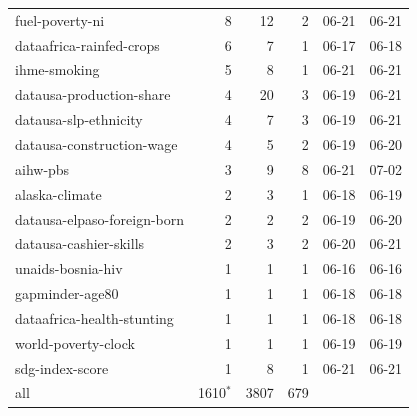 \begin{tabular}{lrrrll}
fuel-poverty-ni & 8 & 12 & 2 & 06-21 & 06-21 \\
dataafrica-rainfed-crops & 6 & 7 & 1 & 06-17 & 06-18 \\
ihme-smoking & 5 & 8 & 1 & 06-21 & 06-21 \\
datausa-production-share & 4 & 20 & 3 & 06-19 & 06-21 \\
datausa-slp-ethnicity & 4 & 7 & 3 & 06-19 & 06-21 \\
datausa-construction-wage & 4 & 5 & 2 & 06-19 & 06-20 \\
aihw-pbs & 3 & 9 & 8 & 06-21 & 07-02 \\
alaska-climate & 2 & 3 & 1 & 06-18 & 06-19 \\
datausa-elpaso-foreign-born & 2 & 2 & 2 & 06-19 & 06-20 \\
datausa-cashier-skills & 2 & 3 & 2 & 06-20 & 06-21 \\
unaids-bosnia-hiv & 1 & 1 & 1 & 06-16 & 06-16 \\
gapminder-age80 & 1 & 1 & 1 & 06-18 & 06-18 \\
dataafrica-health-stunting & 1 & 1 & 1 & 06-18 & 06-18 \\
world-poverty-clock & 1 & 1 & 1 & 06-19 & 06-19 \\
sdg-index-score & 1 & 8 & 1 & 06-21 & 06-21 \\
\midrule
all & 1610$^*$ & 3807 & 679 & & \\
\bottomrule
\end{tabular}
